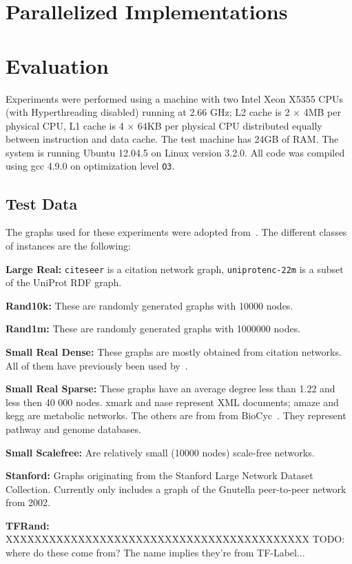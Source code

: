 \documentclass[12pt,a4paper,twoside]{article}
\begin{document}
\section{Parallelized Implementations}

\section{Evaluation}

Experiments were performed using a machine with two Intel Xeon X5355 CPUs (with Hyperthreading disabled) running at 2.66 GHz; L2 cache is 2 $\times$ 4MB per physical CPU, L1 cache is 4 $\times$ 64KB per physical CPU distributed equally between instruction and data cache. The test machine has 24GB of RAM.
The system is running Ubuntu 12.04.5 on Linux version 3.2.0. All code was compiled using gcc 4.9.0 on optimization level \texttt{O3}.

\subsection{Test Data}

The graphs used for these experiments were adopted from~\cite{preach}. The different classes of instances are the following:
\begin{description}
  \item{\textbf{Large Real:}} \verb|citeseer| is a citation network graph, \verb|uniprotenc-22m| is a subset of the UniProt RDF graph.
  \item{\textbf{Rand10k:}} These are randomly generated graphs with 10000 nodes.
  \item{\textbf{Rand1m:}} These are randomly generated graphs with 1000000 nodes.
  \item{\textbf{Small Real Dense:}} These graphs are mostly obtained from citation networks. All of them have previously been used by~\cite{Jin:2009:HIS:1559845.1559930}.
  \item{\textbf{Small Real Sparse:}} These graphs have an average degree less than 1.22 and less then
    40 000 nodes. xmark and nase represent XML documents; amaze and kegg are metabolic
    networks. The others are from from BioCyc~\cite{grail}. They represent pathway and genome
    databases.
  \item{\textbf{Small Scalefree:}} Are relatively small (10000 nodes) scale-free networks.
  \item{\textbf{Stanford:}} Graphs originating from the Stanford Large Network Dataset Collection. Currently only includes a graph of the Gnutella peer-to-peer network from 2002.
  \item{\textbf{TFRand:}} XXXXXXXXXXXXXXXXXXXXXXXXXXXXXXXXXXXXXXXXXX TODO: where do these come from? The name implies they're from TF-Label...
\end{description}
\end{document}
